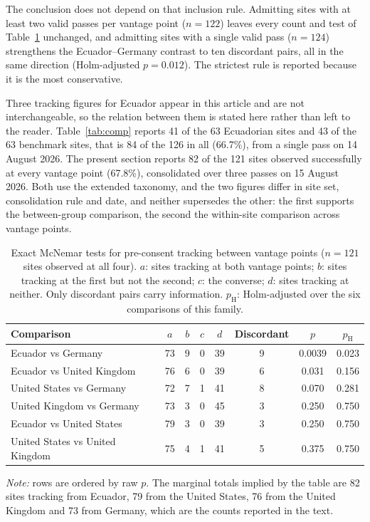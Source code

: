 \documentclass[]{interact}
\begin{document}
The conclusion does not depend on that inclusion rule. Admitting sites with at least two valid passes per vantage point ($n=122$) leaves every count and test of Table~\ref{tab:vantage} unchanged, and admitting sites with a single valid pass ($n=124$) strengthens the Ecuador--Germany contrast to ten discordant pairs, all in the same direction (Holm-adjusted $p=0.012$). The strictest rule is reported because it is the most conservative.

Three tracking figures for Ecuador appear in this article and are not interchangeable, so the relation between them is stated here rather than left to the reader. Table~\ref{tab:comp} reports 41 of the 63 Ecuadorian sites and 43 of the 63 benchmark sites, that is 84 of the 126 in all (66.7\%), from a single pass on 14 August 2026. The present section reports 82 of the 121 sites observed successfully at every vantage point (67.8\%), consolidated over three passes on 15 August 2026. Both use the extended taxonomy, and the two figures differ in site set, consolidation rule and date, and neither supersedes the other: the first supports the between-group comparison, the second the within-site comparison across vantage points.

\begin{table}[htbp]
	\centering
	\caption{Exact McNemar tests for pre-consent tracking between vantage points ($n=121$ sites observed at all four). $a$: sites tracking at both vantage points; $b$: sites tracking at the first but not the second; $c$: the converse; $d$: sites tracking at neither. Only discordant pairs carry information. $p_{\text{H}}$: Holm-adjusted over the six comparisons of this family.}\label{tab:vantage}
	\small
	\begin{tabular}{@{}lccccccc@{}}
		\toprule
		\textbf{Comparison} & $a$ & $b$ & $c$ & $d$ & \textbf{Discordant} & \textbf{$p$} & \textbf{$p_{\text{H}}$} \\
		\midrule
		Ecuador vs Germany & 73 & 9 & 0 & 39 & 9 & 0.0039 & 0.023 \\
		Ecuador vs United Kingdom & 76 & 6 & 0 & 39 & 6 & 0.031 & 0.156 \\
		United States vs Germany & 72 & 7 & 1 & 41 & 8 & 0.070 & 0.281 \\
		United Kingdom vs Germany & 73 & 3 & 0 & 45 & 3 & 0.250 & 0.750 \\
		Ecuador vs United States & 79 & 3 & 0 & 39 & 3 & 0.250 & 0.750 \\
		United States vs United Kingdom & 75 & 4 & 1 & 41 & 5 & 0.375 & 0.750 \\
		\bottomrule
	\end{tabular}
	\par\vspace{3pt}
	\footnotesize\RaggedRight\textit{Note:} rows are ordered by raw $p$. The marginal totals implied by the table are 82 sites tracking from Ecuador, 79 from the United States, 76 from the United Kingdom and 73 from Germany, which are the counts reported in the text.
\end{table}
\end{document}

